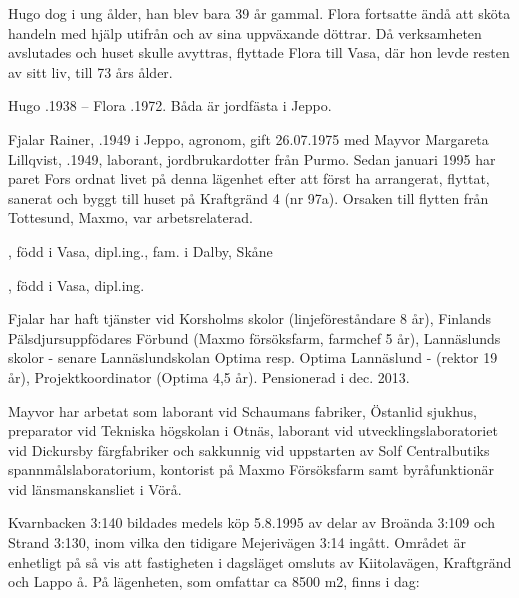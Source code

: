 Hugo dog i ung ålder, han blev bara 39 år gammal. Flora fortsatte ändå att sköta handeln med hjälp utifrån och av sina uppväxande döttrar. Då verksamheten avslutades och huset skulle avyttras, flyttade Flora till Vasa, där hon levde resten av sitt liv, till 73 års ålder.

Hugo .1938  --  Flora .1972. 	Båda är jordfästa i Jeppo.





Fjalar Rainer, .1949 i Jeppo, agronom, gift 26.07.1975 med Mayvor Margareta Lillqvist, .1949, laborant, jordbrukardotter från Purmo. Sedan januari 1995 har paret Fors ordnat livet på denna lägenhet efter att först ha arrangerat, flyttat, sanerat och	byggt till huset på Kraftgränd 4 (nr 97a). Orsaken till flytten från Tottesund, Maxmo, var arbetsrelaterad.

\begin{jhchildren}
  \item {}, född i Vasa, dipl.ing., fam. i Dalby, Skåne
  \item {}, född i Vasa, dipl.ing.
\end{jhchildren}


Fjalar har haft tjänster vid Korsholms skolor (linjeföreståndare 8 år), Finlands Pälsdjursuppfödares Förbund (Maxmo försöksfarm, farmchef 5 år), Lannäslunds skolor - senare Lannäslundskolan Optima resp. Optima Lannäslund - (rektor 19 år), Projektkoordinator (Optima 4,5 år).	Pensionerad i dec. 2013.

Mayvor har arbetat som laborant vid Schaumans fabriker, Östanlid sjukhus, preparator vid Tekniska högskolan i Otnäs, laborant vid 	utvecklingslaboratoriet vid Dickursby färgfabriker och sakkunnig vid uppstarten av Solf Centralbutiks spannmålslaboratorium, kontorist på Maxmo Försöksfarm samt byråfunktionär vid länsmanskansliet i Vörå.

Kvarnbacken 3:140 bildades medels köp 5.8.1995 av delar av Broända 3:109 och Strand 3:130, inom vilka den tidigare Mejerivägen 3:14 ingått. Området är enhetligt på så vis att fastigheten i dagsläget omsluts av Kiitolavägen, Kraftgränd och Lappo å. På lägenheten, som omfattar ca 8500 m2,  finns i dag:

